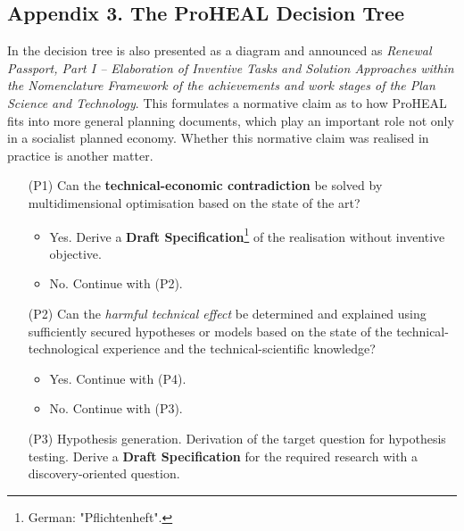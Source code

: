 \documentclass[12pt,a4paper]{article}
\begin{document}
\subsection*{Appendix 3. The ProHEAL Decision Tree}

In \cite[Appendix]{13} the decision tree is also presented as a diagram and
announced as \emph{Renewal Passport, Part I -- Elaboration of Inventive Tasks
  and Solution Approaches within the Nomenclature Framework of the
  achievements and work stages of the Plan Science and Technology}.  This
formulates a normative claim as to how ProHEAL fits into more general planning
documents, which play an important role not only in a socialist planned
economy.  Whether this normative claim was realised in practice is another
matter.

\begin{itemize}[leftmargin=30pt,itemsep=6pt]
\item[(P1)] Can the \textbf{technical-economic contradiction} be solved by
  multidimensional optimisation based on the state of the art?
  \begin{itemize}
  \item Yes. Derive a \textbf{Draft Specification}\footnote{German:
    "Pflichtenheft".} of the realisation without inventive objective.
  \item No. Continue with (P2).
  \end{itemize}
\item[(P2)] Can the \emph{harmful technical effect} be determined and
  explained using sufficiently secured hypotheses or models based on the state
  of the technical-technological experience and the technical-scientific
  knowledge?
  \begin{itemize}
  \item Yes. Continue with (P4).
  \item No. Continue with (P3).
  \end{itemize}
\item[(P3)] Hypothesis generation. Derivation of the target question for
  hypothesis testing.  Derive a \textbf{Draft Specification} for the required
  research with a discovery-oriented question.


\end{itemize}
\end{document}
